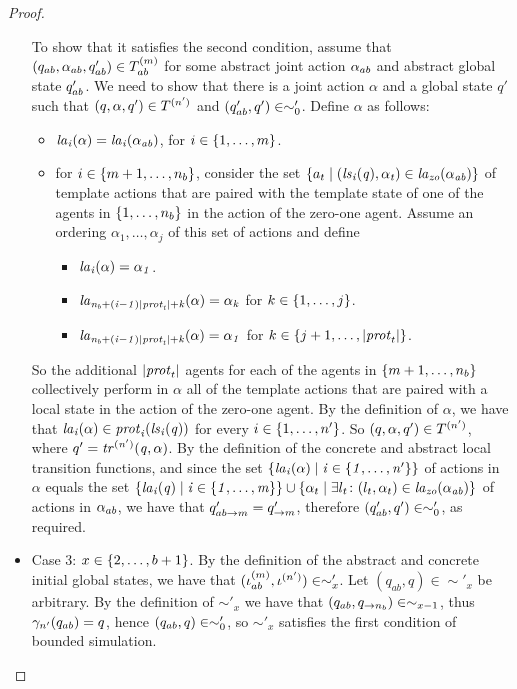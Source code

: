 \documentclass{article}
\begin{document}
\begin{proof}
\begin{itemize}
  To show that it satisfies the second condition, assume that $(q_{ab},
  \alpha_{ab}, q_{ab}') \in T^{(m)}_{ab}$ for some abstract joint action
  $\alpha_{ab}$ and abstract global state $q_{ab}'$. We need to show that there
  is a joint action $\alpha$ and a  global state $q'$ such that $(q, \alpha, q')
  \in T^{(n')}$ and $(q_{ab}', q') \in \sim'_0$.  
Define $\alpha$ as
  follows:

  \begin{itemize}
      \item $\it{la}_{i}({\alpha}) = \it{la}_{i}({\alpha_{ab}})$, for $i \in \left \{ 1,\ldots,m \right \}$.
      \item  for $i \in \left \{ m+1,\ldots,n_b \right \}$, consider the set $\left \{ a_t \mid (\it{ls}_{i}(q),\alpha_t) \in \it{la}_{zo}({\alpha_{ab}}) \right \}$ of template actions
          that are paired with the template state of one of the agents in $\left \{ 1,\ldots,n_b \right \}$
    in the action of the zero-one agent. Assume an ordering $\alpha_1, \ldots,
    \alpha_j$ of this set of  actions and define
    \begin{itemize}
        \item $\it{la}_{i}({\alpha}) = \alpha_1$.
        \item  $\it{la}_{n_b + (i -1) |\mathit{prot}_{t}| + k}({\alpha}) = \alpha_k$  for $k \in \left \{ 1,\ldots,j \right \}$.
    \item $\it{la}_{n_b + (i-1) |\mathit{prot}_{t}| + k}({\alpha}) = \alpha_1$ for $k \in
    \left \{ j+1, \ldots, |\mathit{prot}_{t}| \right \}$.
    \end{itemize}
  \end{itemize}

So the additional $|\mathit{prot}_{t}|$ agents for each of the agents in
        $\left \{ m+1,\ldots,n_b \right \}$ collectively perform in $\alpha$ all of the template actions
        that are paired with a local state in the action of  the zero-one
        agent. By the definition of $\alpha$, we have that $\it{la}_{i}({\alpha}) \in \mathit{prot}_{i}(\it{ls}_{i}(q))$ for every $i \in \left \{ 1,\ldots,n' \right \}$. So $(q, \alpha, q') \in T^{(n')}$, where $q' = \it{tr}^{(n')} (q, \alpha)$. By the definition of the
  concrete and abstract local transition functions, and since the set
        $\left \{ \it{la}_{i}({\alpha}) \mid i \in \left \{ 1,\ldots,n' \right \} \right \}$ of actions in $\alpha$ equals the set
  $\left \{ \it{la}_{i}({q}) \mid i \in \left \{ 1,\ldots,m \right \} \right \} \cup \left \{ \alpha_t \mid \exists
  l_t \colon (l_t, \alpha_t) \in \it{la}_{zo}({\alpha_{ab}}) \right \}$ of actions in $\alpha_{ab}$,
  we have that $q'_{ab \rightarrow m} = q'_{\rightarrow m}$, therefore
  $(q_{ab}', q') \in \sim'_0$, as required. 


  \item Case 3: $x \in \left \{ 2, \ldots, b+1 \right \}$.  
 By the definition of the abstract and concrete initial
      global states, we have that $(\iota^{({m})}_{ab}, \iota^{({n'})}) \in
        \sim'_x$. Let $(q_{ab}, q) \in \sim'_x$ be arbitrary. 
      By the definition of $\sim'_x$
        we have that $(q_{ab}, q_{\rightarrow n_b}) \in \sim_{x-1}$, thus $\gamma_{n'}(q_{ab}) = q$, hence $(q_{ab}, q) \in \sim'_0$, so $\sim'_{x}$
  satisfies the first condition of bounded simulation. 



\end{itemize}
\end{proof}
\end{document}
